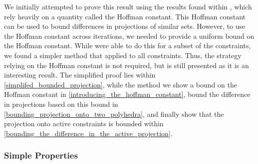 \documentclass{article}
\theoremstyle{case}
\numberwithin{theorem}{subsection}
\begin{document}
We initially attempted to prove this result using the results found within \cite{pena2020new},
which rely heavily on a quantity called the Hoffman constant.
This Hoffman constant can be used to bound differences in projections of similar sets.
However, to use the Hoffman constant across iterations, we needed to provide a uniform bound on the Hoffman constant.
While were able to do this for a subset of the constraints, we found a simpler method that applied to all constraints.
Thus, the strategy relying on the Hoffman constant is not required, but is still presented as it is an interesting result.
The simplified proof lies within \cref{simplifed_bounded_projection}, 
while the method we show a bound on the Hoffman constant in \cref{introducing_the_hoffman_constant}, 
bound the difference in projections based on this bound in \cref{bounding_projection_onto_two_polyhedra},
and finally show that the projection onto active constraints is bounded within \cref{bounding_the_difference_in_the_active_projection}.

\subsubsection{Simple Properties}
\end{document}
